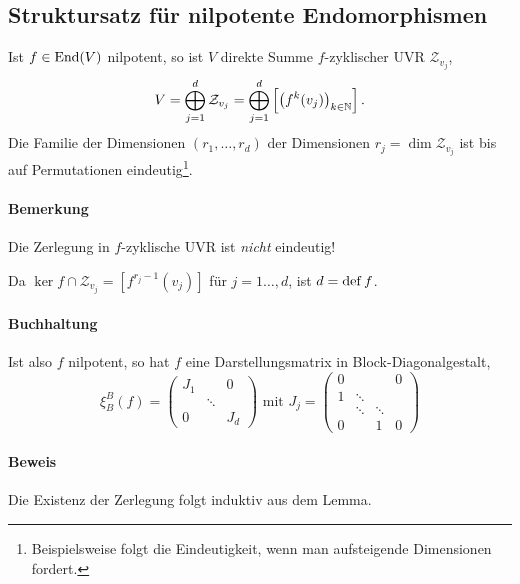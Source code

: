 \subsection{Struktursatz für nilpotente Endomorphismen}
\begin{Satz}
	Ist $ f\in \operatorname{End}(V) $ nilpotent, so ist $ V $ direkte Summe $ f $-zyklischer UVR $ \mathcal{Z}_{v_j} $,
		\[ V = \bigoplus_{j=1}^d \mathcal{Z}_{v_j} =
		\bigoplus_{j=1}^d \left[\left(f^k(v_j)\right)_{k\in \mathbb{N}}\right].  \]
	Die Familie der Dimensionen $ (r_1,\dots,r_d) $ der Dimensionen $ r_j = \dim \mathcal{Z}_{v_j} $ ist bis auf Permutationen eindeutig\footnote{Beispielsweise folgt die Eindeutigkeit, wenn man aufsteigende Dimensionen fordert.}.
\end{Satz}
\paragraph{Bemerkung}
	Die Zerlegung in $ f $-zyklische UVR ist \emph{nicht} eindeutig!

	Da $ \ker f\cap \mathcal{Z}_{v_j} = \left[f^{r_j-1}(v_j) \right] $ für $ j=1\dots,d $, ist $ d = \operatorname{def} f $.
\paragraph{Buchhaltung}
	Ist also $ f $ nilpotent, so hat $ f $ eine Darstellungsmatrix in Block-Diagonalgestalt,
		\[ \xi_B^B(f) = \begin{pmatrix}
		J_1 & & 0 \\
		& \ddots & \\
		0 & & J_d
		\end{pmatrix} \text{ mit } J_j = \begin{pmatrix}
		0 & & & 0\\1 & \ddots & &\\ & \ddots &\ddots &\\ 0 & & 1 & 0
		\end{pmatrix} \]
\paragraph{Beweis}
	Die Existenz der Zerlegung folgt induktiv aus dem Lemma.
	
